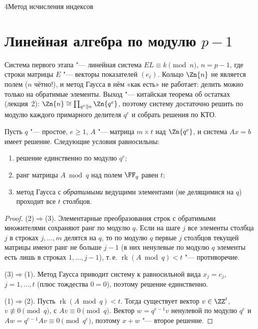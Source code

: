 \begin{lecture}{4}{Метод исчисления индексов}


\section{Линейная алгебра по модулю \texorpdfstring{$p - 1$}{p - 1}}

Система первого этапа "--- линейная система $E L \equiv k \pmod{n}$, $n = p - 1$, где строки
матрицы $E$ "--- векторы показателей $(e_\ell)$. Кольцо $\Zn{n}$ не является полем ($n$ чётно!),
и метод Гаусса в нём «как есть» не работает: делить можно только на обратимые элементы. Выход "---
китайская теорема об остатках (лекция~2): $\Zn{n} \cong \prod_{q^e \parallel n} \Zn{q^e}$, поэтому
систему достаточно решить по модулю каждого примарного делителя $q^e$ и собрать решения по КТО.

\begin{theorem}\label{l4:local}
Пусть $q$ "--- простое, $e \ge 1$, $A$ "--- матрица $m \times t$ над $\Zn{q^e}$, и система
$Ax = b$ имеет решение. Следующие условия равносильны:
\begin{enumerate}
  \item решение единственно по модулю $q^e$;
  \item ранг матрицы $A \bmod q$ над полем $\FF_q$ равен $t$;
  \item метод Гаусса с \emph{обратимыми} ведущими элементами (не делящимися на $q$) проходит все
    $t$ столбцов.
\end{enumerate}
\end{theorem}

\begin{proof}
(2)$\Rightarrow$(3). Элементарные преобразования строк с обратимыми множителями сохраняют ранг
по модулю $q$. Если на шаге $j$ все элементы столбца $j$ в строках $j, \dots, m$ делятся на $q$,
то по модулю $q$ первые $j$ столбцов текущей матрицы имеют ранг не больше $j - 1$ (в них
ненулевые по модулю $q$ элементы есть лишь в строках $1, \dots, j - 1$), т.\,е. $\operatorname{rk}
(A \bmod q) < t$ "--- противоречие.

(3)$\Rightarrow$(1). Метод Гаусса приводит систему к равносильной вида $x_j = c_j$,
$j = 1, \dots, t$ (плюс тождества $0 = 0$), поэтому решение единственно.

(1)$\Rightarrow$(2). Пусть $\operatorname{rk}(A \bmod q) < t$. Тогда существует вектор
$v \in \ZZ^t$, $v \not\equiv 0 \pmod q$, с $Av \equiv 0 \pmod q$. Вектор $w = q^{e-1} v$ ненулевой
по модулю $q^e$ и $Aw = q^{e-1} A v \equiv 0 \pmod{q^e}$, поэтому $x + w$ "--- второе решение.
\end{proof}


\end{lecture}
